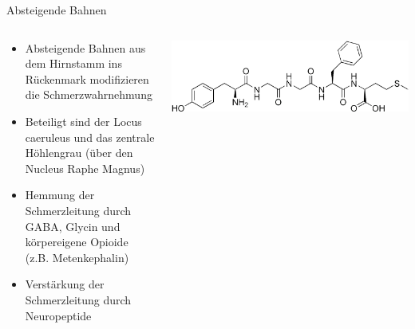 \documentclass{beamer}
\begin{document}
\begin{frame}{Absteigende Bahnen}


\begin{columns}[c]

\begin{column}{7cm}
\begin{itemize}
    \item 
    Absteigende Bahnen aus dem Hirnstamm ins Rückenmark modifizieren die Schmerzwahrnehmung
    \item
    Beteiligt sind der Locus caeruleus und das zentrale Höhlengrau (über den Nucleus Raphe Magnus)
    \item
    Hemmung der Schmerzleitung durch GABA, Glycin und körpereigene Opioide (z.B. Metenkephalin)
    \item
    Verstärkung der Schmerzleitung durch Neuropeptide
\end{itemize}

\end{column}

\begin{column}{3cm}
\begin{center}
    \includegraphics[width=2\textwidth, angle=90]{Met-enkephalin.png}
\end{center}
\end{column}


\end{columns}



\end{frame}


\end{document}

